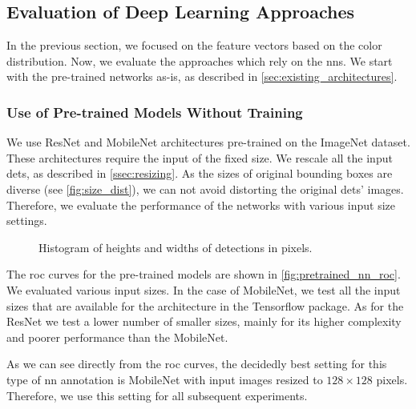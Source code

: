 \subsection{Evaluation of Deep Learning Approaches}

In the previous section, we focused on the feature vectors based on the color distribution. Now, we evaluate the approaches which rely on the \glspl{nn}. We start with the pre-trained networks as-is, as described in \autoref{sec:existing_architectures}.

\subsubsection{Use of Pre-trained Models Without Training}


We use ResNet and MobileNet architectures
pre-trained on the ImageNet dataset. These architectures
require the input of the fixed size. We rescale all the input \glspl{det}, as described in \autoref{ssec:resizing}. As the sizes of original bounding boxes are diverse (see
\autoref{fig:size_dist}), we can not avoid distorting the original \glspl{det}' images.
Therefore, we evaluate the performance of the networks with various input size settings.

\begin{figure}
    \centering
    \def\svgwidth{\columnwidth}
    
    \caption{Histogram of heights and widths of detections in pixels.}
    \label{fig:size_dist}
\end{figure}

The \gls{roc} curves for the pre-trained models are shown in \autoref{fig:pretrained_nn_roc}.
We evaluated various input sizes. In the case of MobileNet, we test
all the input sizes that are available for the architecture in the Tensorflow package. As for the 
ResNet we test a lower number of smaller sizes, mainly for its higher
complexity and poorer performance than the MobileNet.

As we can see directly from the \gls{roc} curves, the decidedly best setting for this type of \gls{nn} annotation is MobileNet with input images resized to $128 \times 128$ pixels. Therefore, we use this setting for all subsequent experiments.

